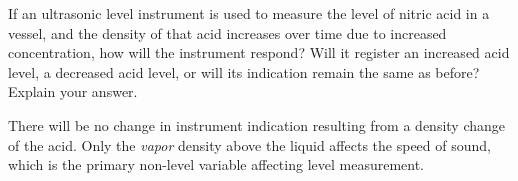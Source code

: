 

If an ultrasonic level instrument is used to measure the level of nitric acid in a vessel, and the density of that acid increases over time due to increased concentration, how will the instrument respond?  Will it register an increased acid level, a decreased acid level, or will its indication remain the same as before?  Explain your answer.







There will be no change in instrument indication resulting from a density change of the acid.  Only the {\it vapor} density above the liquid affects the speed of sound, which is the primary non-level variable affecting level measurement.











